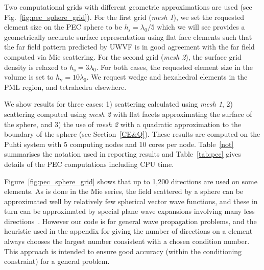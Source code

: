 \documentclass[a4paper,12pt]{article}
\newcommand{\hs}{h_{\mathrm{s}}}
\newcommand{\hv}{h_{\mathrm{v}}}
\begin{document}
Two computational grids with different geometric approximations are
used (see Fig.~\ref{fig:pec_sphere_grid}). For the first grid
(\emph{mesh 1}), we set the requested element size on the PEC sphere
to be $\hs=\lambda_0/5$ which we will see provides a geometrically
accurate surface representation using flat face elements such that the
far field pattern predicted by UWVF is in good agreement with the far
field computed via Mie scattering. For the second grid (\emph{mesh
2}), the surface grid density is relaxed to $\hs=3\lambda_0$. For both
cases, the requested element size in the volume is set to
$\hv=10\lambda_0$. We request wedge and hexahedral elements in the PML
region, and tetrahedra elsewhere.

We show results for three cases: 1) scattering calculated using
\emph{mesh 1}, 2) scattering computed using \emph{mesh 2} with flat
facets approximating the surface of the sphere, and 3) the use of
\emph{mesh 2} with a quadratic approximation to the boundary of the
sphere (see Section~\ref{CE&Q}). These results are computed on the
Puhti system with 5 computing nodes and 10 cores per
node. Table~\ref{not} summarises the notation used in reporting
results and Table~\ref{tab:pec} gives details of the PEC computations
including CPU time.

Figure~\ref{fig:pec_sphere_grid} shows that up to 1,200 directions are
used on some elements.  As is done in the Mie series, the field
scattered by a sphere can be approximated well by relatively few
spherical vector wave functions, and these in turn can be approximated
by special plane wave expansions involving many less
directions~\cite{macphie03}.  However our code is for general wave
propagation problems, and the heuristic used in the appendix for
giving the number of directions on a element always chooses the
largest number consistent with a chosen condition number.  This
approach is intended to ensure good accuracy (within the conditioning
constraint) for a general problem.
\end{document}
